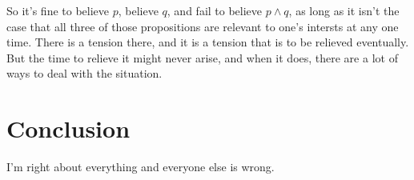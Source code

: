 \documentclass[11pt,]{book}
\begin{document}
So it's fine to believe \(p\), believe \(q\), and fail to believe \(p \wedge q\), as long as it isn't the case that all three of those propositions are relevant to one's intersts at any one time. There is a tension there, and it is a tension that is to be relieved eventually. But the time to relieve it might never arise, and when it does, there are a lot of ways to deal with the situation.

\hypertarget{conclusion}{%
\chapter{Conclusion}\label{conclusion}}

I'm right about everything and everyone else is wrong.


\end{document}
